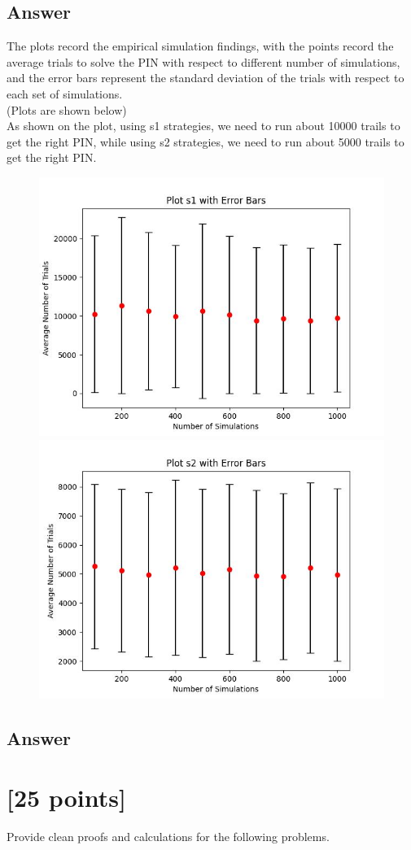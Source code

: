 \subsection{Answer}
The plots record the empirical simulation findings, with the points record the average trials to 
solve the PIN with respect to different number of simulations, and the error bars represent the 
standard deviation of the trials with respect to each set of simulations.\\
(Plots are shown below)\\
As shown on the plot, using s1 strategies, we need to run about 10000 trails to get the right PIN,
while using s2 strategies, we need to run about 5000 trails to get the right PIN.
\begin{figure}[h]
 	\includegraphics[width=0.5\linewidth]{s1plot.jpeg}
	\includegraphics[width=0.5\linewidth]{s2plot.jpeg}
	\hfill
	\label{fig:label}
\end{figure}

\subsection{Answer}


\newpage 

\section{ [25 points]} 
 

Provide clean proofs and calculations for the following problems. 

